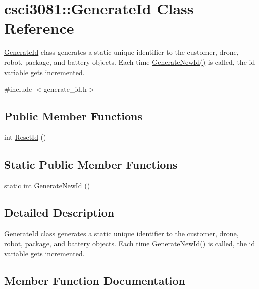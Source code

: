 \hypertarget{classcsci3081_1_1GenerateId}{}\section{csci3081\+:\+:Generate\+Id Class Reference}
\label{classcsci3081_1_1GenerateId}


\hyperlink{classcsci3081_1_1GenerateId}{Generate\+Id} class generates a static unique identifier to the customer, drone, robot, package, and battery objects. Each time \hyperlink{classcsci3081_1_1GenerateId_a26a75b8750133b7624199a29c5620dd5}{Generate\+New\+Id()} is called, the {\ttfamily id} variable gets incremented.  




{\ttfamily \#include $<$generate\+\_\+id.\+h$>$}

\subsection*{Public Member Functions}
\begin{DoxyCompactItemize}
\item 
int \hyperlink{classcsci3081_1_1GenerateId_afb9af0fc5150212ef877a786fa597c9b}{Reset\+Id} ()
\end{DoxyCompactItemize}
\subsection*{Static Public Member Functions}
\begin{DoxyCompactItemize}
\item 
static int \hyperlink{classcsci3081_1_1GenerateId_a26a75b8750133b7624199a29c5620dd5}{Generate\+New\+Id} ()
\end{DoxyCompactItemize}


\subsection{Detailed Description}
\hyperlink{classcsci3081_1_1GenerateId}{Generate\+Id} class generates a static unique identifier to the customer, drone, robot, package, and battery objects. Each time \hyperlink{classcsci3081_1_1GenerateId_a26a75b8750133b7624199a29c5620dd5}{Generate\+New\+Id()} is called, the {\ttfamily id} variable gets incremented. 

\subsection{Member Function Documentation}
\mbox{\label{classcsci3081_1_1GenerateId_a26a75b8750133b7624199a29c5620dd5}} 
